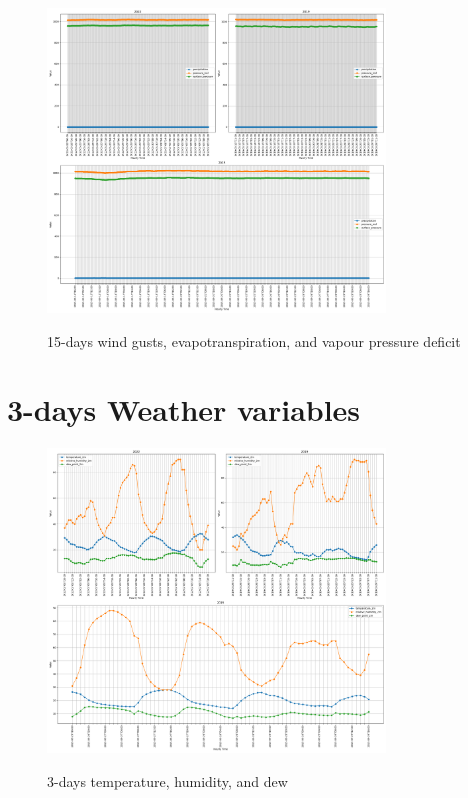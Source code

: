 \begin{figure}[h]
	\centering
	\caption{15-days wind gusts, evapotranspiration, and vapour pressure deficit }
	\includegraphics[width=0.8\textwidth]{graphs/weather_variables/15_precipitation_pressure_msl_surface_pressure.png}
	\label{fig:evapotranspiration}
\end{figure}


\section{3-days Weather variables}

\begin{figure}[h]
	\centering
	\caption{3-days temperature, humidity, and dew}
	\includegraphics[width=0.8\textwidth]{graphs/weather_variables/3_temperature_2m_relative_humidity_2m_dew_point_2m.png}
	\label{fig:temp_hum_dew_3day}
\end{figure}

